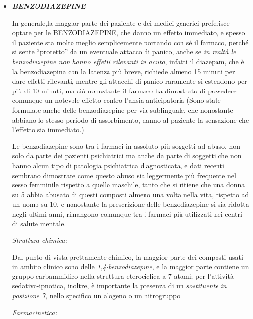 \begin{itemize}
\item
  \emph{\textbf{BENZODIAZEPINE}}

In generale,la maggior parte dei paziente e dei medici generici
preferisce optare per le BENZODIAZEPINE, che danno un effetto immediato,
e spesso il paziente sta molto meglio semplicemente portando con sé il
farmaco, perché si sente ``protetto'' da un eventuale attacco di panico,
anche se \emph{in realtà le benzodiazepine non hanno effetti rilevanti
in acuto}, infatti il diazepam, che è la benzodiazepina con la latenza
più breve, richiede almeno 15 minuti per dare effetti rilevanti, mentre
gli attacchi di panico raramente si estendono per più di 10 minuti, ma
ciò nonostante il farmaco ha dimostrato di possedere comunque un
notevole effetto contro l'ansia anticipatoria (Sono state formulate
anche delle benzodiazepine per via sublinguale, che nonostante abbiano
lo stesso periodo di assorbimento, danno al paziente la sensazione che
l'effetto sia immediato.)

Le benzodiazepine sono tra i farmaci in assoluto più soggetti ad abuso,
non solo da parte dei pazienti psichiatrici ma anche da parte di
soggetti che non hanno alcun tipo di patologia psichiatrica
diagnosticata, e dati recenti sembrano dimostrare come questo abuso sia
leggermente più frequente nel sesso femminile rispetto a quello
maschile, tanto che si ritiene che una donna su 5 abbia abusato di
questi composti almeno una volta nella vita, rispetto ad un uomo su 10,
e nonostante la prescrizione delle benzodiazepine si sia ridotta negli
ultimi anni, rimangono comunque tra i farmaci più utilizzati nei centri
di salute mentale.

\emph{\emph{Struttura chimica:}}

Dal punto di vista prettamente chimico, la maggior parte dei composti
usati in ambito clinico sono delle \emph{1,4-benzodiazepine}, e la
maggior parte contiene un gruppo carbammidico nella struttura
eterociclica a 7 atomi; per l'attività sedativo-ipnotica, inoltre, è
importante la presenza di un \emph{sostituente in posizione 7}, nello
specifico un alogeno o un nitrogruppo.

\emph{\emph{Farmacinetica:}}


\end{itemize}
